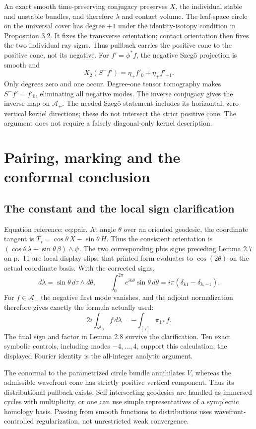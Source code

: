 \documentclass[10pt]{article}
\begin{document}
An exact smooth time-preserving conjugacy preserves \(X\), the individual stable and unstable bundles, and therefore \(\lambda\) and contact volume. The leaf-space circle on the universal cover has degree \(+1\) under the identity-isotopy condition in Proposition 3.2. It fixes the transverse orientation; contact orientation then fixes the two individual ray signs. Thus pullback carries the positive cone to the positive cone, not its negative. For \(f'=\phi^*f\), the negative Szegö projection is smooth and \[X_2(S^-f')=\eta_+f'_0+\eta_+f'_{-1}.\] Only degrees zero and one occur. Degree-one tensor tomography makes \(S^-f'=f'_0\), eliminating all negative modes. The inverse conjugacy gives the inverse map on \(\mathcal A_+\). The needed Szegö statement includes its horizontal, zero-vertical kernel directions; these do not intersect the strict positive cone. The argument does not require a falsely diagonal-only kernel description.\par
\section*{Pairing, marking and the conformal conclusion}
\subsection*{The constant and the local sign clarification}
Equation reference: eq:pair. At angle \(\theta\) over an oriented geodesic, the coordinate tangent is \(T_\tau=\cos\theta\,X-\sin\theta\,H\). Thus the consistent orientation is \((\cos\theta\,\lambda-\sin\theta\,\beta)\wedge\psi\). The two corresponding plus signs preceding Lemma 2.7 on p. 11 are local display slips: that printed form evaluates to \(\cos(2\theta)\) on the actual coordinate basis. With the corrected signs, \[d\lambda=\sin\theta\,d\tau\wedge d\theta,\qquad
 \int_0^{2\pi}e^{ik\theta}\sin\theta\,d\theta
 =i\pi(\delta_{k1}-\delta_{k,-1}).\] For \(f\in\mathcal A_+\) the negative first mode vanishes, and the adjoint normalization therefore gives exactly the formula actually used: \[
 2i\int_{S^1\gamma}f\,d\lambda
 =-\int_{[\gamma]}\pi_{1*}f .\] The final sign and factor in Lemma 2.8 survive the clarification. Ten exact symbolic controls, including modes \(-4,\ldots,4\), support this calculation; the displayed Fourier identity is the all-integer analytic argument.\par
The conormal to the parametrized circle bundle annihilates \(V\), whereas the admissible wavefront cone has strictly positive vertical component. Thus its distributional pullback exists. Self-intersecting geodesics are handled as immersed cycles with multiplicity, or one can use simple representatives of a symplectic homology basis. Passing from smooth functions to distributions uses wavefront-controlled regularization, not unrestricted weak convergence.\par
\end{document}
